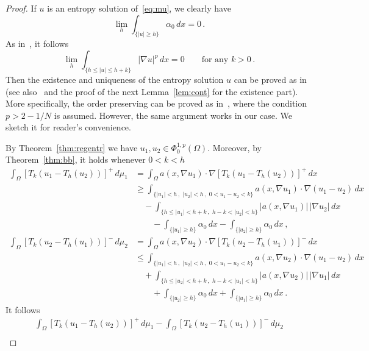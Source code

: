 \documentclass[twoside,reqno]{amsart}
\numberwithin{equation}{section}
\theoremstyle{definition}
\begin{document}
\begin{proof}
If $u$ is an entropy solution of~\eqref{eq:mu}, we clearly have
\[
\lim_h \int_{\{|u|\geq h\}} \alpha_0\,dx = 0\,.
\]
As 
in~\cite[Formula~(7)]{boccardo_gallouet_orsina1996}, it follows
\begin{equation}
\label{eq:hk}
\lim_h \int_{\{h\leq |u|\leq h+k\}} |\nabla u|^p\,dx = 0
\qquad\text{for any $k>0$}\,.
\end{equation}
Then the existence and uniqueness of the entropy solution $u$ 
can be proved as in~\cite{boccardo_gallouet_orsina1996}
(see 
also~\cite{benilan_boccardo_gallouet_gariepy_pierre_vazquez1995}
and the proof of the next Lemma~\ref{lem:cont} for the existence 
part).
More specifically, the order preserving can be proved as 
in~\cite[Theorem~2.5]{kilpelainen_xu1996}, where the condition
$p>2-1/N$ is assumed.
However, the same argument works in our case.
We sketch it for reader's convenience.
\par
By Theorem~\ref{thm:regentr} we have 
$u_1, u_2\in \Phi^{1,p}_0(\Omega)$.
Moreover, by Theorem~\ref{thm:bb}, it holds whenever $0<k<h$
\[
\begin{split}
\int_\Omega [T_k(u_1 - T_h(u_2))]^+\,d\mu_1 &=
\int_\Omega a(x,\nabla u_1)\cdot
\nabla [T_k(u_1 - T_h(u_2))]^+\,dx \\
&\geq
\int_{\{|u_1|<h\,,\,\,|u_2|<h\,,\,\,0<u_1-u_2<k\}} 
a(x,\nabla u_1)\cdot\nabla(u_1 - u_2)\,dx \\
&\quad
- \int_{\{h\leq |u_1| < h+k\,,\,\,h-k<|u_2|<h\}} 
|a(x,\nabla u_1)|\,|\nabla u_2|\,dx \\
&\quad\quad
- \int_{\{|u_1|\geq h\}} 
\alpha_0\,dx 
- \int_{\{|u_2|\geq h\}} 
\alpha_0\,dx \,,
\end{split}
\]
\[
\begin{split}
\int_\Omega [T_k(u_2 - T_h(u_1))]^-\,d\mu_2 &=
\int_\Omega a(x,\nabla u_2)\cdot
\nabla [T_k(u_2 - T_h(u_1))]^-\,dx \\
&\leq
\int_{\{|u_1|<h\,,\,\,|u_2|<h\,,\,\,0<u_1-u_2<k\}} 
a(x,\nabla u_2)\cdot\nabla(u_1 - u_2)\,dx \\
&\quad
+ \int_{\{h\leq |u_2| < h+k\,,\,\,h-k<|u_1|<h\}} 
|a(x,\nabla u_2)|\,|\nabla u_1|\,dx \\
&\quad\quad
+ \int_{\{|u_2|\geq h\}} 
\alpha_0\,dx 
+ \int_{\{|u_1|\geq h\}} 
\alpha_0\,dx\,.
\end{split}
\]
It follows
\begin{multline*}
\int_\Omega [T_k(u_1 - T_h(u_2))]^+\,d\mu_1 
- \int_\Omega [T_k(u_2 - T_h(u_1))]^-\,d\mu_2 \\

\end{multline*}
\end{proof}
\end{document}

